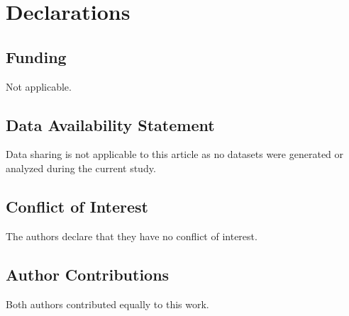 \documentclass[11pt, reqno]{amsart}
\numberwithin{equation}{section}
\begin{document}
\section*{{\bf Declarations}}
\subsection*{Funding} Not applicable.
\subsection*{Data Availability Statement}
Data sharing is not applicable to this article as no datasets were generated or analyzed during the current study.
\subsection*{Conflict of Interest}
The authors declare that they have no conflict of interest. 
\subsection*{Author Contributions}
Both authors contributed equally to this work.
\end{document}
